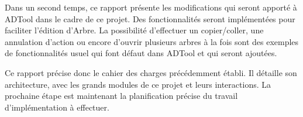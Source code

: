 	Dans un second temps, ce rapport présente les modifications qui seront apporté à ADTool dans le cadre de ce projet. Des fonctionnalités seront implémentées pour faciliter l'édition d'Arbre. La possibilité d'effectuer un copier/coller, une annulation d'action ou encore d'ouvrir plusieurs arbres à la fois sont des exemples de fonctionnalités usuel qui font défaut dans ADTool et qui seront ajoutées. 


	Ce rapport précise donc le cahier des charges précédemment établi. Il détaille son architecture, avec les grands modules de ce projet et leurs interactions. La prochaine étape est maintenant la planification précise du travail d'implémentation à effectuer. 
